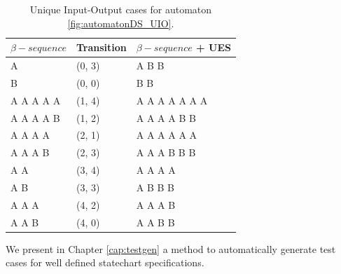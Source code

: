 \begin{table}
\begin{center}
\begin{tabular}{| l | l| l|}

\hline

$\beta-sequence$ & Transition & $\beta-sequence$ + UES \\ \hline

A & (0, 3) & A B B\\ \hline
B & (0, 0) & B B\\ \hline
A A A A A & (1, 4) & A A A A A A A\\ \hline
A A A A B & (1, 2) & A A A A B B \\ \hline
A A A A & (2, 1) & A A A A A A\\ \hline
A A A B & (2, 3) & A A A B B B\\ \hline
A A & (3, 4) & A A A A\\ \hline
A B & (3, 3) & A B B B\\ \hline
A A A & (4, 2) & A A A B \\ \hline
A A B & (4, 0) & A A B B \\
\hline
\end{tabular}
\end{center}
\caption{Unique Input-Output cases for automaton \ref{fig:automatonDS_UIO}.\cite{inpe10}}
\label{tableUES_2}
\end{table}

We present in Chapter \ref{cap:testgen} a method to automatically generate test cases for well defined statechart specifications.


